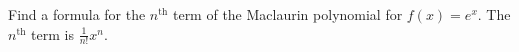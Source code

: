 {Find a formula for the $n^\text{th}$ term of the Maclaurin polynomial for $f(x)=e^x$.
}
{The $n^\text{th}$ term is $\frac{1}{n!}x^n$.
}